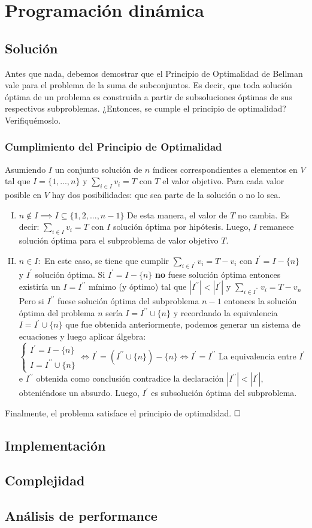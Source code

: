 \section{Programación dinámica}
\subsection{Solución}
Antes que nada, debemos demostrar que el Principio de Optimalidad de Bellman vale para el problema de la suma de subconjuntos. Es decir, que toda solución óptima de un problema es construida a partir de subsoluciones óptimas de sus respectivos subproblemas. ¿Entonces, se cumple el principio de optimalidad? Verifiquémoslo.

\subsubsection{Cumplimiento del Principio de Optimalidad}
Asumiendo $I$ un conjunto solución de $n$ índices correspondientes a elementos en $V$ tal que $I=\{1, ..., n\}$ y $\sum_{i \in I}v_{i} = T$ con $T$ el valor objetivo. Para cada valor posible en $V$ hay dos posibilidades: que sea parte de la solución o no lo sea.

\begin{enumerate}[I)]
\item $n \notin I \implies I \subseteq \{1, 2, ..., n-1\}$
	\vskip 0pt
	De esta manera, el valor de $T$ no cambia. Es decir: $\sum_{i \in I}v_{i}=T$ con $I$ solución óptima por hipótesis. Luego, $I$ remanece solución óptima para el subproblema de valor objetivo $T$.
\item $n \in I:$
	\vskip 0pt
	En este caso, se tiene que cumplir $\sum_{i \in I^\prime}v_{i}=T-v_{i}$ con $I^\prime=I-\{n\}$ y $I^\prime$ solución óptima.
	\vskip 8pt
	Si $I^\prime=I-\{n\}$ \textbf{no} fuese solución óptima entonces existiría un $I=I^{\prime\prime}$ mínimo (y óptimo) tal que $|I^{\prime\prime}| < |I^\prime|$ y $\sum_{i \in I^{\prime\prime}}v_{i} = T - v_{n}$
	\vskip 8pt
	Pero si $I^{\prime\prime}$ fuese solución óptima del subproblema $n-1$ entonces la solución óptima del problema $n$ sería $I = I^{\prime\prime} \cup \{n\}$ y recordando la equivalencia $I=I^\prime \cup \{n\}$ que fue obtenida anteriormente, podemos generar un sistema de ecuaciones y luego aplicar álgebra:
	\vskip 8pt
	$
		\begin{cases}
			I^\prime = I - \{n\} \\ 
			I = I^{\prime\prime} \cup \{n\}
		\end{cases}
		\iff
		I^\prime = (I^{\prime\prime} \cup \{n\}) - \{n\} \iff I^\prime = I^{\prime\prime}
	$
	\vskip 8pt
	La equivalencia entre $I^\prime$ e $I^{\prime\prime}$ obtenida como conclusión contradice la declaración $|I^{\prime\prime}| < |I^\prime|$, obteniéndose un absurdo. Luego, $I^\prime$ es subsolución óptima del subproblema.
\end{enumerate}
Finalmente, el problema satisface el principio de optimalidad.
\vskip 8pt
$\qedwhite$

\subsection{Implementación}
\subsection{Complejidad}
\subsection{Análisis de performance}